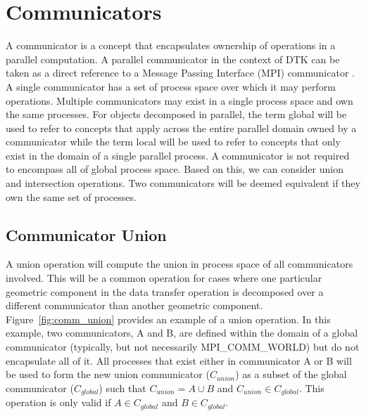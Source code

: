 \documentclass[letterpaper,12pt]{article}
\begin{document}
\section{Communicators}\label{sec:communicators}
A communicator is a concept that encapsulates ownership of operations
in a parallel computation. A parallel communicator in the context of
DTK can be taken as a direct reference to a Message Passing Interface
(MPI) communicator \cite{MPI_1994}. A single communicator has a set of
process space over which it may perform operations. Multiple
communicators may exist in a single process space and own the same
processes. For objects decomposed in parallel, the term global will be
used to refer to concepts that apply across the entire parallel domain
owned by a communicator while the term local will be used to refer to
concepts that only exist in the domain of a single parallel process. A
communicator is not required to encompass all of global process
space. Based on this, we can consider union and intersection
operations. Two communicators will be deemed equivalent if they own
the same set of processes.

\subsection{Communicator Union}\label{subsec:comm_union}
A union operation will compute the union in process space of all
communicators involved. This will be a common operation for cases
where one particular geometric component in the data transfer
operation is decomposed over a different communicator than another
geometric component. Figure~\ref{fig:comm_union} provides an example
of a union operation. In this example, two communicators, A and B, are
defined within the domain of a global communicator (typically, but not
necessarily MPI\_COMM\_WORLD) but do not encapsulate all of it. All
processes that exist either in communicator A or B will be used to
form the new union communicator ($C_{union}$) as a subset of the
global communicator ($C_{global}$) such that $C_{union} = A \cup B$
and $C_{union} \in C_{global}$. This operation is only valid if $A \in
C_{global}$ and $B \in C_{global}$.
\end{document}
